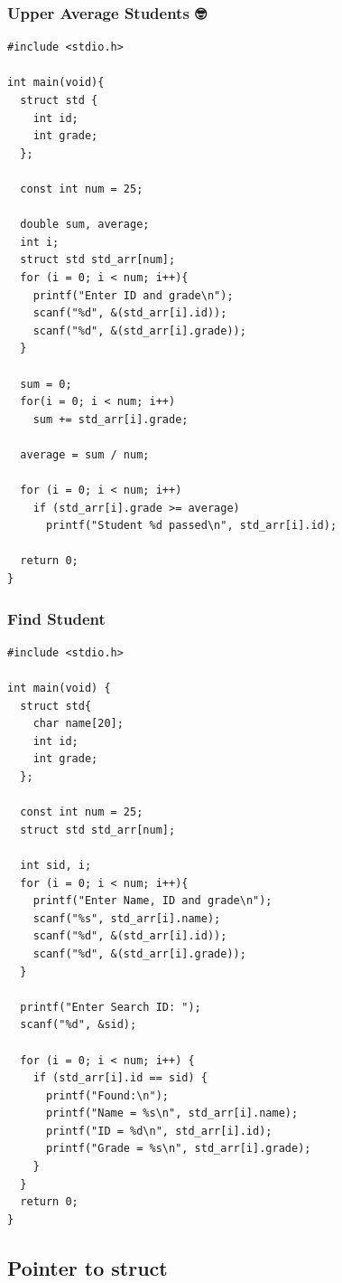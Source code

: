 \documentclass{../c-lecture}
\begin{document}
\begin{frame}[fragile]
  \frametitle{Upper Average Students 🤓}
  \begin{verbatim}
#include <stdio.h>

int main(void){
  struct std {
    int id;
    int grade;
  };

  const int num = 25;

  double sum, average;
  int i;
  struct std std_arr[num];
  for (i = 0; i < num; i++){
    printf("Enter ID and grade\n");
    scanf("%d", &(std_arr[i].id));
    scanf("%d", &(std_arr[i].grade));
  }

  sum = 0;
  for(i = 0; i < num; i++)
    sum += std_arr[i].grade;

  average = sum / num;

  for (i = 0; i < num; i++)
    if (std_arr[i].grade >= average)
      printf("Student %d passed\n", std_arr[i].id);

  return 0;
}
  \end{verbatim}
\end{frame}

\begin{frame}[fragile]
  \frametitle{Find Student}
  \begin{verbatim}
#include <stdio.h>

int main(void) {
  struct std{
    char name[20];
    int id;
    int grade;
  };

  const int num = 25;
  struct std std_arr[num];

  int sid, i;
  for (i = 0; i < num; i++){
    printf("Enter Name, ID and grade\n");
    scanf("%s", std_arr[i].name);
    scanf("%d", &(std_arr[i].id));
    scanf("%d", &(std_arr[i].grade));
  }

  printf("Enter Search ID: ");
  scanf("%d", &sid);

  for (i = 0; i < num; i++) {
    if (std_arr[i].id == sid) {
      printf("Found:\n");
      printf("Name = %s\n", std_arr[i].name);
      printf("ID = %d\n", std_arr[i].id);
      printf("Grade = %s\n", std_arr[i].grade);
    }
  }
  return 0;
}
  \end{verbatim}
\end{frame}

\subsection{Pointer to struct}
\end{document}
